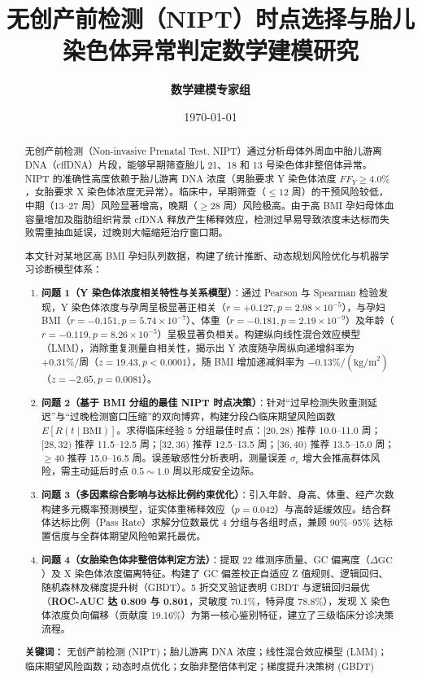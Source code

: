 \documentclass[11pt,a4paper]{article}
\title{\textbf{\Large 无创产前检测（NIPT）时点选择与胎儿染色体异常判定数学建模研究}}
\author{\textbf{数学建模专家组}}
\date{\today}
\begin{document}
\maketitle

\begin{abstract}
无创产前检测（Non-invasive Prenatal Test, NIPT）通过分析母体外周血中胎儿游离 DNA（cffDNA）片段，能够早期筛查胎儿 21、18 和 13 号染色体非整倍体异常。NIPT 的准确性高度依赖于胎儿游离 DNA 浓度（男胎要求 Y 染色体浓度 $FF_Y \ge 4.0\%$，女胎要求 X 染色体浓度无异常）。临床中，早期筛查（$\le 12$ 周）的干预风险较低，中期（13--27 周）风险显著增高，晚期（$\ge 28$ 周）风险极高。由于高 BMI 孕妇母体血容量增加及脂肪组织背景 cfDNA 释放产生稀释效应，检测过早易导致浓度未达标而失败需重抽血延误，过晚则大幅缩短治疗窗口期。

本文针对某地区高 BMI 孕妇队列数据，构建了统计推断、动态规划风险优化与机器学习诊断模型体系：
\begin{enumerate}[leftmargin=*]
    \item \textbf{问题 1（Y 染色体浓度相关特性与关系模型）}：通过 Pearson 与 Spearman 检验发现，Y 染色体浓度与孕周呈极显著正相关（$r = +0.127, p = 2.98 \times 10^{-5}$），与孕妇 BMI（$r = -0.151, p = 5.74 \times 10^{-7}$）、体重（$r = -0.181, p = 2.19 \times 10^{-9}$）及年龄（$r = -0.119, p = 8.26 \times 10^{-5}$）呈极显著负相关。构建纵向线性混合效应模型（LMM），消除重复测量自相关性，揭示出 Y 浓度随孕周纵向递增斜率为 $+0.31\%/\text{周}$（$z = 19.43, p < 0.0001$），随 BMI 增加递减斜率为 $-0.13\%/(\text{kg/m}^2)$（$z = -2.65, p = 0.0081$）。
    \item \textbf{问题 2（基于 BMI 分组的最佳 NIPT 时点决策）}：针对“过早检测失败重测延迟”与“过晚检测窗口压缩”的双向博弈，构建分段凸临床期望风险函数 $E[R(t \mid \text{BMI})]$。求得临床经验 5 分组最佳时点：$[20, 28)$ 推荐 10.0--11.0 周；$[28, 32)$ 推荐 11.5--12.5 周；$[32, 36)$ 推荐 12.5--13.5 周；$[36, 40)$ 推荐 13.5--15.0 周；$\ge 40$ 推荐 15.0--16.5 周。误差敏感性分析表明，测量误差 $\sigma_e$ 增大会推高群体风险，需主动延后时点 $0.5 \sim 1.0$ 周以形成安全边际。
    \item \textbf{问题 3（多因素综合影响与达标比例约束优化）}：引入年龄、身高、体重、经产次数构建多元概率预测模型，证实体重稀释效应（$p = 0.042$）与高龄延缓效应。结合群体达标比例（Pass Rate）求解分位数最优 4 分组与各组时点，兼顾 90\%--95\% 达标置信度与全群体期望风险帕累托最优。
    \item \textbf{问题 4（女胎染色体非整倍体判定方法）}：提取 22 维测序质量、GC 偏离度（$\Delta\text{GC}$）及 X 染色体浓度偏离特征。构建了 GC 偏差校正自适应 Z 值规则、逻辑回归、随机森林及梯度提升树（GBDT）。5 折交叉验证表明 GBDT 与逻辑回归最优（\textbf{ROC-AUC 达 0.809 与 0.801}，灵敏度 70.1\%，特异度 78.8\%），发现 X 染色体浓度负向偏移（贡献度 19.16\%）为第一核心鉴别特征，建立了三级临床分诊决策流程。
\end{enumerate}

\textbf{关键词：} 无创产前检测 (NIPT)；胎儿游离 DNA 浓度；线性混合效应模型 (LMM)；临床期望风险函数；动态时点优化；女胎非整倍体判定；梯度提升决策树 (GBDT)
\end{abstract}
\end{document}
